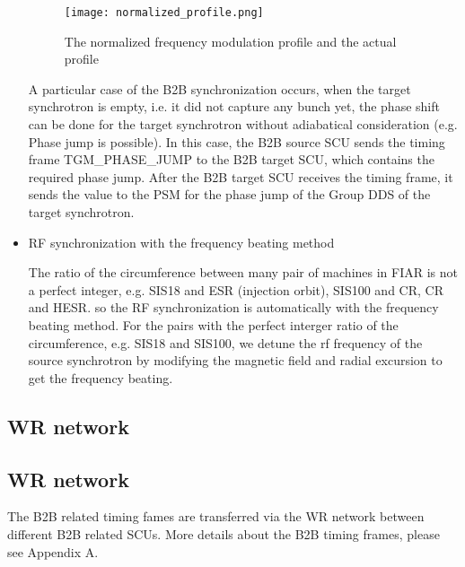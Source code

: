 \begin{itemize}
\begin{figure}[!htb]
   \centering   
   \texttt{[image: normalized\_profile.png]}
   \caption{The normalized frequency modulation profile and the actual profile}
   \label{normalized_profile}
\end{figure}  

A particular case of the B2B synchronization occurs, when the target synchrotron is empty, i.e. it did not capture any bunch yet, the phase shift can be done for the target synchrotron without adiabatical consideration (e.g. Phase jump is possible). In this case, the B2B source SCU sends the timing frame TGM\_PHASE\_JUMP to the B2B target SCU, which contains the required phase jump. After the B2B target SCU receives the timing frame, it sends the value to the PSM for the phase jump of the Group DDS of the target synchrotron. 

\item RF synchronization with the frequency beating method

The ratio of the circumference between many pair of machines in FIAR is not a perfect integer, e.g. SIS18 and ESR (injection orbit), SIS100 and CR, CR and HESR. so the RF synchronization is automatically with the frequency beating method. For the pairs with the perfect interger ratio of the circumference, e.g. SIS18 and SIS100, we detune the rf frequency of the source synchrotron by modifying the magnetic field and radial excursion to get the frequency beating.

\end{itemize}

\subsection{WR network}
\subsection{WR network}

The B2B related timing fames are transferred via the WR network between different B2B related SCUs. More details about the B2B timing frames, please see Appendix A.  
